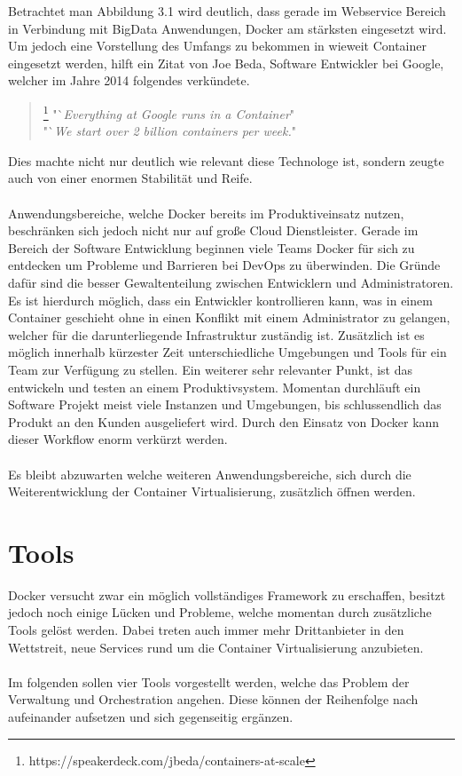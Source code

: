 \documentclass[12pt,toc=bib,toc=listof]{scrreprt}
\begin{document}
Betrachtet man Abbildung 3.1 wird deutlich, dass gerade im Webservice Bereich in Verbindung mit BigData Anwendungen, Docker am stärksten eingesetzt wird.
Um jedoch eine Vorstellung des Umfangs zu bekommen in wieweit Container eingesetzt werden, hilft ein Zitat von Joe Beda, Software Entwickler bei Google, welcher im Jahre 2014 folgendes verkündete.
\begin{quote}
	\footnote[2]{https://speakerdeck.com/jbeda/containers-at-scale}
	"`\textit{Everything at Google runs in a Container}"\\
	"`\textit{We start over 2 billion containers per week.}"
\end{quote}
Dies machte nicht nur deutlich wie relevant diese Technologe ist, sondern zeugte auch von einer enormen Stabilität und Reife.\\
\\
Anwendungsbereiche, welche Docker bereits im Produktiveinsatz nutzen, beschränken sich jedoch nicht nur auf große Cloud Dienstleister.
Gerade im Bereich der Software Entwicklung beginnen viele Teams Docker für sich zu entdecken um Probleme und Barrieren bei DevOps zu überwinden.
Die Gründe dafür sind die besser Gewaltenteilung zwischen Entwicklern und Administratoren.
Es ist hierdurch möglich, dass ein Entwickler kontrollieren kann, was in einem Container geschieht ohne in einen Konflikt mit einem Administrator zu gelangen, welcher für die darunterliegende Infrastruktur zuständig ist. 
Zusätzlich ist es möglich innerhalb kürzester Zeit unterschiedliche Umgebungen und Tools für ein Team zur Verfügung zu stellen.
Ein weiterer sehr relevanter Punkt, ist das entwickeln und testen an einem Produktivsystem. Momentan durchläuft ein Software Projekt meist viele Instanzen und Umgebungen, bis schlussendlich das Produkt an den Kunden ausgeliefert wird. Durch den Einsatz von Docker kann dieser Workflow enorm verkürzt werden.\\
\\
Es bleibt abzuwarten welche weiteren Anwendungsbereiche, sich durch die Weiterentwicklung der Container Virtualisierung, zusätzlich öffnen werden.

\section{Tools}
Docker versucht zwar ein möglich vollständiges Framework zu erschaffen, besitzt jedoch noch einige Lücken und Probleme, welche momentan durch zusätzliche Tools gelöst werden.
Dabei treten auch immer mehr Drittanbieter in den Wettstreit, neue Services rund um die Container Virtualisierung anzubieten.\\
\\
Im folgenden sollen vier Tools vorgestellt werden, welche das Problem der Verwaltung und Orchestration angehen.
Diese können der Reihenfolge nach aufeinander aufsetzen und sich gegenseitig ergänzen.
\end{document}
